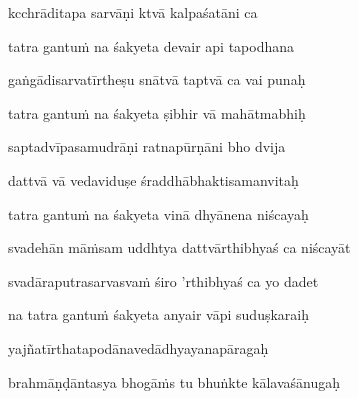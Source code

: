 kcchrāditapa sarvāṇi ktvā kalpaśatāni ca \danda\dontdisplaylinenum

tatra gantuṁ na śakyeta devair api tapodhana \veg\dontdisplaylinenum
{}

gaṅgādisarvatīrtheṣu snātvā taptvā ca vai punaḥ\thinspace{\dandab} \dontdisplaylinenum

tatra gantuṁ na śakyeta ṣibhir vā mahātmabhiḥ \veg\dontdisplaylinenum
{}

saptadvīpasamudrāṇi ratnapūrṇāni bho dvija\thinspace{\dandab} \dontdisplaylinenum

dattvā vā vedaviduṣe śraddhābhaktisamanvitaḥ \danda\dontdisplaylinenum

tatra gantuṁ na śakyeta vinā dhyānena niścayaḥ \veg\dontdisplaylinenum
{}

svadehān māṁsam uddhtya dattvārthibhyaś ca niścayāt\thinspace{\dandab} \dontdisplaylinenum

svadāraputrasarvasvaṁ śiro 'rthibhyaś ca yo dadet \danda\dontdisplaylinenum

na tatra gantuṁ śakyeta anyair vāpi suduṣkaraiḥ \veg\dontdisplaylinenum
{}

yajñatīrthatapodānavedādhyayanapāragaḥ\thinspace{\dandab} \dontdisplaylinenum

brahmāṇḍāntasya bhogāṁs tu bhuṅkte kālavaśānugaḥ \veg\dontdisplaylinenum
{}

